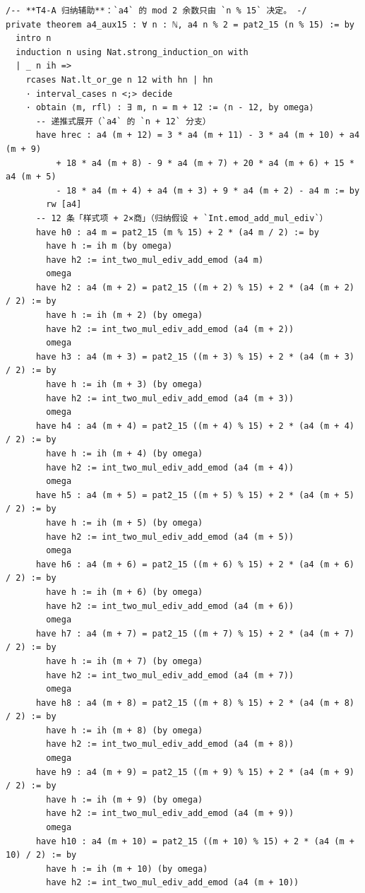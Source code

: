 \documentclass[11pt]{article}
\begin{document}
\begin{lstlisting}
/-- **T4-A 归纳辅助**：`a4` 的 mod 2 余数只由 `n % 15` 决定。 -/
private theorem a4_aux15 : ∀ n : ℕ, a4 n % 2 = pat2_15 (n % 15) := by
  intro n
  induction n using Nat.strong_induction_on with
  | _ n ih =>
    rcases Nat.lt_or_ge n 12 with hn | hn
    · interval_cases n <;> decide
    · obtain ⟨m, rfl⟩ : ∃ m, n = m + 12 := ⟨n - 12, by omega⟩
      -- 递推式展开（`a4` 的 `n + 12` 分支）
      have hrec : a4 (m + 12) = 3 * a4 (m + 11) - 3 * a4 (m + 10) + a4 (m + 9)
          + 18 * a4 (m + 8) - 9 * a4 (m + 7) + 20 * a4 (m + 6) + 15 * a4 (m + 5)
          - 18 * a4 (m + 4) + a4 (m + 3) + 9 * a4 (m + 2) - a4 m := by
        rw [a4]
      -- 12 条「样式项 + 2×商」（归纳假设 + `Int.emod_add_mul_ediv`）
      have h0 : a4 m = pat2_15 (m % 15) + 2 * (a4 m / 2) := by
        have h := ih m (by omega)
        have h2 := int_two_mul_ediv_add_emod (a4 m)
        omega
      have h2 : a4 (m + 2) = pat2_15 ((m + 2) % 15) + 2 * (a4 (m + 2) / 2) := by
        have h := ih (m + 2) (by omega)
        have h2 := int_two_mul_ediv_add_emod (a4 (m + 2))
        omega
      have h3 : a4 (m + 3) = pat2_15 ((m + 3) % 15) + 2 * (a4 (m + 3) / 2) := by
        have h := ih (m + 3) (by omega)
        have h2 := int_two_mul_ediv_add_emod (a4 (m + 3))
        omega
      have h4 : a4 (m + 4) = pat2_15 ((m + 4) % 15) + 2 * (a4 (m + 4) / 2) := by
        have h := ih (m + 4) (by omega)
        have h2 := int_two_mul_ediv_add_emod (a4 (m + 4))
        omega
      have h5 : a4 (m + 5) = pat2_15 ((m + 5) % 15) + 2 * (a4 (m + 5) / 2) := by
        have h := ih (m + 5) (by omega)
        have h2 := int_two_mul_ediv_add_emod (a4 (m + 5))
        omega
      have h6 : a4 (m + 6) = pat2_15 ((m + 6) % 15) + 2 * (a4 (m + 6) / 2) := by
        have h := ih (m + 6) (by omega)
        have h2 := int_two_mul_ediv_add_emod (a4 (m + 6))
        omega
      have h7 : a4 (m + 7) = pat2_15 ((m + 7) % 15) + 2 * (a4 (m + 7) / 2) := by
        have h := ih (m + 7) (by omega)
        have h2 := int_two_mul_ediv_add_emod (a4 (m + 7))
        omega
      have h8 : a4 (m + 8) = pat2_15 ((m + 8) % 15) + 2 * (a4 (m + 8) / 2) := by
        have h := ih (m + 8) (by omega)
        have h2 := int_two_mul_ediv_add_emod (a4 (m + 8))
        omega
      have h9 : a4 (m + 9) = pat2_15 ((m + 9) % 15) + 2 * (a4 (m + 9) / 2) := by
        have h := ih (m + 9) (by omega)
        have h2 := int_two_mul_ediv_add_emod (a4 (m + 9))
        omega
      have h10 : a4 (m + 10) = pat2_15 ((m + 10) % 15) + 2 * (a4 (m + 10) / 2) := by
        have h := ih (m + 10) (by omega)
        have h2 := int_two_mul_ediv_add_emod (a4 (m + 10))

\end{lstlisting}
\end{document}
